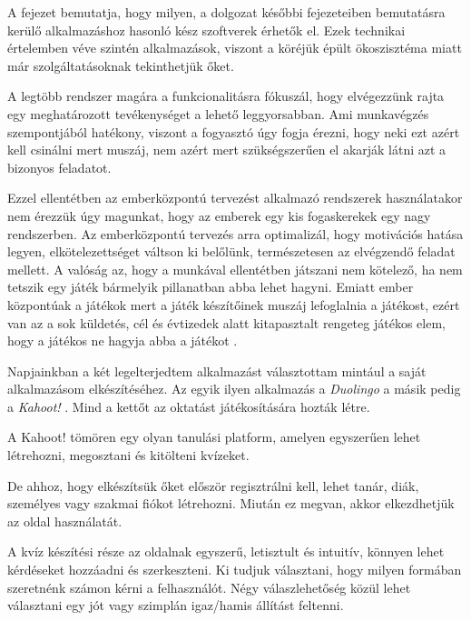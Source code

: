 
A fejezet bemutatja, hogy milyen, a dolgozat későbbi fejezeteiben bemutatásra kerülő alkalmazáshoz hasonló kész szoftverek érhetők el. Ezek technikai értelemben véve szintén alkalmazások, viszont a köréjük épült ökoszisztéma miatt már szolgáltatásoknak tekinthetjük őket.


A legtöbb rendszer magára a funkcionalitásra fókuszál, hogy elvégezzünk rajta egy meghatározott tevékenységet a lehető leggyorsabban. Ami munkavégzés szempontjából hatékony, viszont a fogyasztó úgy fogja érezni, hogy neki ezt azért kell csinálni mert muszáj, nem azért mert szükségszerűen el akarják látni azt a bizonyos feladatot. \newline

Ezzel ellentétben az emberközpontú tervezést alkalmazó rendszerek használatakor nem érezzük úgy magunkat, hogy az emberek egy kis fogaskerekek egy nagy rendszerben. Az emberközpontú tervezés arra optimalizál, hogy motivációs hatása legyen, elkötelezettséget váltson ki belőlünk, természetesen az elvégzendő feladat mellett. A valóság az, hogy a munkával ellentétben játszani nem kötelező, ha nem tetszik egy játék bármelyik pillanatban abba lehet hagyni. Emiatt ember központúak a játékok mert a játék készítőinek muszáj lefoglalnia a játékost, ezért van az a sok küldetés, cél és évtizedek alatt kitapasztalt rengeteg játékos elem, hogy a játékos ne hagyja abba a játékot \cite{actionablegamification}.


Napjainkban a két legelterjedtem alkalmazást választottam mintául a saját alkalmazásom elkészítéséhez. Az egyik ilyen alkalmazás a \textit{Duolingo} \cite{duolingo} a másik pedig a \textit{Kahoot!} \cite{kahoot}. Mind a kettőt az oktatást játékosítására hozták létre.


A Kahoot! tömören egy olyan tanulási platform, amelyen egyszerűen lehet létrehozni, megosztani és kitölteni kvízeket. \newline

De ahhoz, hogy elkészítsük őket először regisztrálni kell, lehet tanár, diák, személyes vagy szakmai fiókot létrehozni. Miután ez megvan, akkor elkezdhetjük az oldal használatát. \newline

A kvíz készítési része az oldalnak egyszerű, letisztult és intuitív, könnyen lehet kérdéseket hozzáadni és szerkeszteni. Ki tudjuk választani, hogy milyen formában szeretnénk számon kérni a felhasználót. Négy válaszlehetőség közül lehet választani egy jót vagy szimplán igaz/hamis állítást feltenni.

